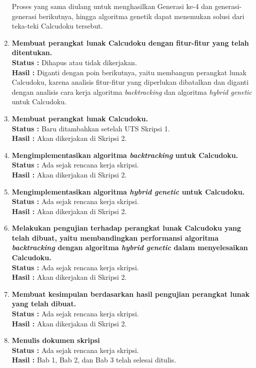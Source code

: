 \documentclass[a4paper,twoside]{article}
\begin{document}
\begin{enumerate}
Proses yang sama diulang untuk menghasilkan Generasi ke-4 dan generasi-generasi berikutnya, hingga algoritma genetik dapat menemukan solusi dari teka-teki Calcudoku tersebut.

		\item \textbf{Membuat perangkat lunak Calcudoku dengan fitur-fitur yang telah ditentukan.}\\
		{\bf Status :} Dihapus atau tidak dikerjakan.\\
		{\bf Hasil :} Diganti dengan poin berikutnya, yaitu membangun perangkat lunak Calcudoku, karena analisis fitur-fitur yang diperlukan dibatalkan dan diganti dengan analisis cara kerja algoritma \textit{backtracking} dan algoritma \textit{hybrid genetic} untuk Calcudoku.
		
		\item \textbf{Membuat perangkat lunak Calcudoku.}\\
		{\bf Status :} Baru ditambahkan setelah UTS Skripsi 1.\\
		{\bf Hasil :} Akan dikerjakan di Skripsi 2.

		\item \textbf{Mengimplementasikan algoritma \textit{backtracking} untuk Calcudoku.}\\
		{\bf Status :} Ada sejak rencana kerja skripsi.\\
		{\bf Hasil :} Akan dikerjakan di Skripsi 2.

		\item \textbf{Mengimplementasikan algoritma \textit{hybrid genetic} untuk Calcudoku.}\\
		{\bf Status :} Ada sejak rencana kerja skripsi. \\
		{\bf Hasil :} Akan dikerjakan di Skripsi 2.

		\item \textbf{Melakukan pengujian terhadap perangkat lunak Calcudoku yang telah dibuat, yaitu membandingkan performansi algoritma \textit{backtracking} dengan algoritma \textit{hybrid genetic} dalam menyelesaikan Calcudoku.} \\
		{\bf Status :} Ada sejak rencana kerja skripsi.\\
		{\bf Hasil :} Akan dikerjakan di Skripsi 2.

		\item \textbf{Membuat kesimpulan berdasarkan hasil pengujian perangkat lunak yang telah dibuat.}\\
		{\bf Status :} Ada sejak rencana kerja skripsi.\\
		{\bf Hasil :} Akan dikerjakan di Skripsi 2.

		\item \textbf{Menulis dokumen skripsi}\\
		{\bf Status :} Ada sejak rencana kerja skripsi.\\
		{\bf Hasil :} Bab 1, Bab 2, dan Bab 3 telah selesai ditulis.

	\end{enumerate}
\end{document}
